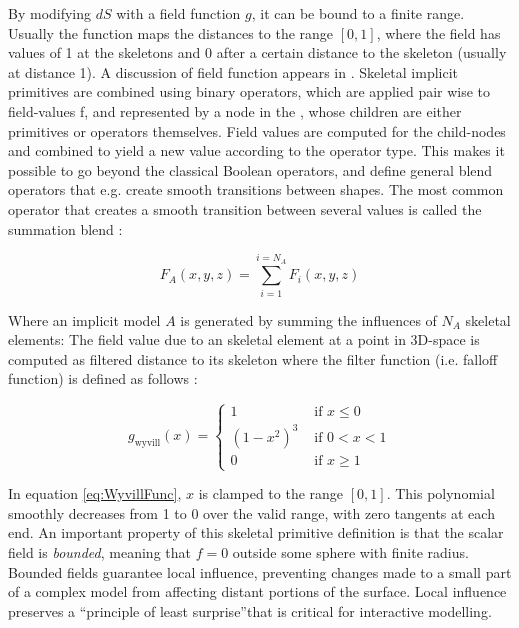 By modifying $dS$ with a field function $g$, it can be bound to a finite range. Usually the function maps the distances to the range $[0, 1]$, 
where the field has values of 1 at the skeletons and 0 after a certain distance to the skeleton (usually at distance 1). A discussion of field 
function appears in \cite{shirley2009graphics}. Skeletal implicit primitives are combined using binary operators, which are applied pair wise to 
field-values f, and represented by a node in the \blob, whose children are either primitives or operators themselves.
Field values are computed for the child-nodes and combined to yield a new value according to the operator type. This makes it possible to go beyond 
the classical Boolean operators, and define general blend operators that e.g. create smooth transitions between shapes. The most common operator 
that creates a smooth transition between several values is called the summation blend \cite{Bloomenthal1997}:

\begin{equation}
F_A(x, y, z)=\sum_{i=1}^{i=N_A}F_i(x, y, z)
\end{equation}

Where an implicit model $A$ is generated by summing the influences of $N_A$ skeletal elements: 
The field value due to an skeletal element at a point in 3D-space is computed as filtered distance to its skeleton 
where the filter function (i.e. falloff function) is defined as follows \cite{Wyvill1999}: 

\begin{equation}
g_\mathrm{wyvill}(x)= \left\{ \begin{array}{rl}
 1 &\mbox{ if $x\leq0$} \\
 (1-x^2)^3 &\mbox{ if $0<x<1$}\\
  0 &\mbox{ if $x\geq1$}  
  \end{array} \right.
\label{eq:WyvillFunc}
\end{equation}

In equation \ref{eq:WyvillFunc}, $x$ is clamped to the range $[0,1]$. This polynomial smoothly decreases from 1 to 0 over the valid range, with zero
tangents at each end. An important property of this skeletal primitive definition is that the scalar field is \textit{bounded}, meaning that $f=0$
outside some sphere with finite radius. Bounded fields guarantee local influence, preventing changes made to a small part of a complex model from
affecting distant portions of the surface. Local influence preserves a \textquotedblleft principle of least surprise\textquotedblright that is critical 
for interactive modelling.  

